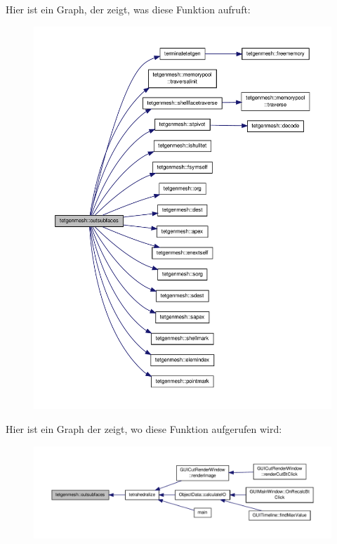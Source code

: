 Hier ist ein Graph, der zeigt, was diese Funktion aufruft\-:\nopagebreak
\begin{figure}[H]
\begin{center}
\leavevmode
\includegraphics[width=350pt]{classtetgenmesh_a357976a26bd46ca731e3492f6d96e7eb_cgraph}
\end{center}
\end{figure}




Hier ist ein Graph der zeigt, wo diese Funktion aufgerufen wird\-:\nopagebreak
\begin{figure}[H]
\begin{center}
\leavevmode
\includegraphics[width=350pt]{classtetgenmesh_a357976a26bd46ca731e3492f6d96e7eb_icgraph}
\end{center}
\end{figure}


